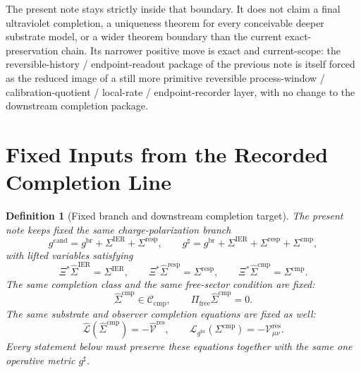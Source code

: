 \documentclass[11pt]{article}
\newcommand{\ObserverMap}{\Xi}
\newcommand{\ObserverMetric}{g^{\mathrm{br}}}
\newcommand{\CandidateMetric}{g^{\mathrm{cand}}}
\newcommand{\CompletedMetric}{g^{\sharp}}
\newcommand{\BaseShift}{\Sigma^{\mathrm{IER}}}
\newcommand{\ResponseShift}{\Sigma^{\mathrm{resp}}}
\newcommand{\CompShift}{\Sigma^{\mathrm{cmp}}}
\newcommand{\BaseLift}{\widehat\Sigma^{\mathrm{IER}}}
\newcommand{\ResponseLift}{\widehat\Sigma^{\mathrm{resp}}}
\newcommand{\CompLift}{\widehat\Sigma^{\mathrm{cmp}}}
\newcommand{\ResidualCore}{\mathcal V_{\mu\nu}^{\mathrm{res}}}
\newcommand{\ResidualLift}{\widehat{\mathcal V}^{\mathrm{res}}}
\newcommand{\SubReducedEin}{\widehat{\mathcal L}}
\newcommand{\FreeProj}{\Pi_{\mathrm{free}}}
\newcommand{\ReducedEin}{\mathcal L_{\ObserverMetric}}
\newcommand{\CompClass}{\mathscr C_{\mathrm{cmp}}}
\newtheorem{definition}{Definition}
\begin{document}
The present note stays strictly inside that boundary. It does not claim a final ultraviolet completion, a uniqueness theorem for every conceivable deeper substrate model, or a wider theorem boundary than the current exact-preservation chain. Its narrower positive move is exact and current-scope: the reversible-history / endpoint-readout package of the previous note is itself forced as the reduced image of a still more primitive reversible process-window / calibration-quotient / local-rate / endpoint-recorder layer, with no change to the downstream completion package.

\section{Fixed Inputs from the Recorded Completion Line}

\begin{definition}[Fixed branch and downstream completion target]
\label{def:fixed_branch}
The present note keeps fixed the same charge-polarization branch
\begin{equation}
\CandidateMetric
=
\ObserverMetric+\BaseShift+\ResponseShift,
\qquad
\CompletedMetric
=
\ObserverMetric+\BaseShift+\ResponseShift+\CompShift,
\label{eq:fixed_metrics}
\end{equation}
with lifted variables satisfying
\begin{equation}
\ObserverMap^*\BaseLift=\BaseShift,
\qquad
\ObserverMap^*\ResponseLift=\ResponseShift,
\qquad
\ObserverMap^*\CompLift=\CompShift.
\label{eq:fixed_lifts}
\end{equation}
The same completion class and the same free-sector condition are fixed:
\begin{equation}
\CompLift\in\CompClass,
\qquad
\FreeProj\CompLift=0.
\label{eq:fixed_free}
\end{equation}
The same substrate and observer completion equations are fixed as well:
\begin{equation}
\SubReducedEin(\CompLift)=-\ResidualLift,
\qquad
\ReducedEin(\CompShift)=-\ResidualCore.
\label{eq:fixed_solves}
\end{equation}
Every statement below must preserve these equations together with the same one operative metric \(\CompletedMetric\).
\end{definition}
\end{document}
